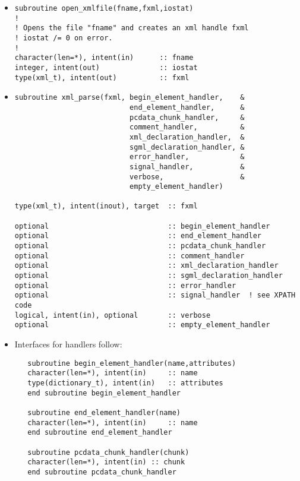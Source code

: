 \documentclass[11pt]{article}
\begin{document}
\begin{itemize}
\item
\begin{verbatim}
subroutine open_xmlfile(fname,fxml,iostat)
!
! Opens the file "fname" and creates an xml handle fxml
! iostat /= 0 on error.
!
character(len=*), intent(in)      :: fname
integer, intent(out)              :: iostat
type(xml_t), intent(out)          :: fxml
\end{verbatim}
\item
\begin{verbatim}
subroutine xml_parse(fxml, begin_element_handler,    &
                           end_element_handler,      &
                           pcdata_chunk_handler,     &
                           comment_handler,          &
                           xml_declaration_handler,  &
                           sgml_declaration_handler, &
                           error_handler,            &
                           signal_handler,           &
                           verbose,                  &
                           empty_element_handler)

type(xml_t), intent(inout), target  :: fxml

optional                            :: begin_element_handler
optional                            :: end_element_handler
optional                            :: pcdata_chunk_handler
optional                            :: comment_handler
optional                            :: xml_declaration_handler
optional                            :: sgml_declaration_handler
optional                            :: error_handler
optional                            :: signal_handler  ! see XPATH code
logical, intent(in), optional       :: verbose
optional                            :: empty_element_handler

\end{verbatim}
\item Interfaces for handlers follow:

\begin{verbatim}
   subroutine begin_element_handler(name,attributes)
   character(len=*), intent(in)     :: name
   type(dictionary_t), intent(in)   :: attributes
   end subroutine begin_element_handler

   subroutine end_element_handler(name)
   character(len=*), intent(in)     :: name
   end subroutine end_element_handler

   subroutine pcdata_chunk_handler(chunk)
   character(len=*), intent(in) :: chunk
   end subroutine pcdata_chunk_handler


\end{verbatim}
\end{itemize}
\end{document}
